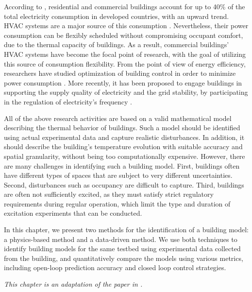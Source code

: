 \documentclass[../../thesis.tex]{subfiles}
\begin{document}
According to \cite{Perez-Lombard:2008aa}, residential and commercial buildings account for up to 40\% of the total electricity consumption in developed countries, with an upward trend. HVAC systems are a major source of this consumption \cite{USenergy:2017}. %
Nevertheless, their power consumption can be flexibly scheduled without compromising occupant comfort, due to the thermal capacity of buildings. 
As a result, commercial buildings' HVAC systems have become the focal point of research, with the goal of utilizing this source of consumption flexibility. From the point of view of energy efficiency, researchers have studied optimization of building control in order to minimize power consumption \cite{Siroky:2011aa, Parisio:2014aa}.  
More recently, it has been proposed to engage buildings in supporting the supply quality of electricity and the grid stability, by participating in the regulation of electricity's frequency \cite{Balandat:2014contractdesign, Lin:2015exp, Vrettos:2014aggregation, Baccino:2014aa}.


All of the above research activities are based on a valid mathematical model describing the thermal behavior of buildings.  
Such a model should be identified using actual experimental data and capture realistic disturbances. 
In addition, it should describe the building's temperature evolution with suitable accuracy and spatial granularity, without being too computationally expensive.
However, there are many challenges in identifying such a building model. 
First, buildings often have different types of spaces that are subject to very different uncertainties. 
Second, disturbances such as occupancy are difficult to capture. 
Third, buildings are often not sufficiently excited, as they must satisfy strict regulatory requirements during regular operation, which limit the type and duration of excitation experiments that can be conducted.  

In this chapter, we present two methods for the identification of a building model: a physics-based method and a data-driven method. 
We use both techniques to identify building models for the same testbed using experimental data collected from the building, and quantitatively compare the models using various metrics, including open-loop prediction accuracy and closed loop control strategies. 

\noindent
\textit{This chapter is an adaptation of the paper in \cite{Zhou:2017modelcomp}.}







\end{document}
